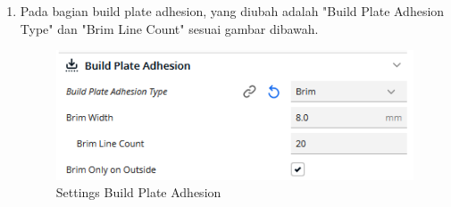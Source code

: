 \begin{enumerate}
    \item Pada bagian build plate adhesion, yang diubah adalah "Build Plate Adhesion Type" dan "Brim Line Count" sesuai gambar dibawah.
    \begin{figure}[H]
        \centering
        \includegraphics[width=0.5\linewidth]{P3/img/Settings Build.png}
        \caption{Settings Build Plate Adhesion}
        \label{fig:Settings Build Plate Adhesion}
    \end{figure}
\end{enumerate}